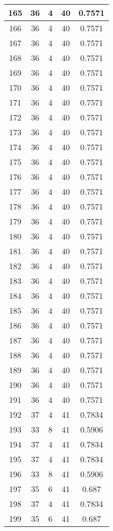 \documentclass[letterpaper, 12pt]{article}
\begin{document}
\begin{longtable}{|c|c|c|c|c|}
\hline
165 & 36 & 4 & 40 & 0.7571 \\
\hline
166 & 36 & 4 & 40 & 0.7571 \\
\hline
167 & 36 & 4 & 40 & 0.7571 \\
\hline
168 & 36 & 4 & 40 & 0.7571 \\
\hline
169 & 36 & 4 & 40 & 0.7571 \\
\hline
170 & 36 & 4 & 40 & 0.7571 \\
\hline
171 & 36 & 4 & 40 & 0.7571 \\
\hline
172 & 36 & 4 & 40 & 0.7571 \\
\hline
173 & 36 & 4 & 40 & 0.7571 \\
\hline
174 & 36 & 4 & 40 & 0.7571 \\
\hline
175 & 36 & 4 & 40 & 0.7571 \\
\hline
176 & 36 & 4 & 40 & 0.7571 \\
\hline
177 & 36 & 4 & 40 & 0.7571 \\
\hline
178 & 36 & 4 & 40 & 0.7571 \\
\hline
179 & 36 & 4 & 40 & 0.7571 \\
\hline
180 & 36 & 4 & 40 & 0.7571 \\
\hline
181 & 36 & 4 & 40 & 0.7571 \\
\hline
182 & 36 & 4 & 40 & 0.7571 \\
\hline
183 & 36 & 4 & 40 & 0.7571 \\
\hline
184 & 36 & 4 & 40 & 0.7571 \\
\hline
185 & 36 & 4 & 40 & 0.7571 \\
\hline
186 & 36 & 4 & 40 & 0.7571 \\
\hline
187 & 36 & 4 & 40 & 0.7571 \\
\hline
188 & 36 & 4 & 40 & 0.7571 \\
\hline
189 & 36 & 4 & 40 & 0.7571 \\
\hline
190 & 36 & 4 & 40 & 0.7571 \\
\hline
191 & 36 & 4 & 40 & 0.7571 \\
\hline
192 & 37 & 4 & 41 & 0.7834 \\
\hline
193 & 33 & 8 & 41 & 0.5906 \\
\hline
194 & 37 & 4 & 41 & 0.7834 \\
\hline
195 & 37 & 4 & 41 & 0.7834 \\
\hline
196 & 33 & 8 & 41 & 0.5906 \\
\hline
197 & 35 & 6 & 41 & 0.687 \\
\hline
198 & 37 & 4 & 41 & 0.7834 \\
\hline
199 & 35 & 6 & 41 & 0.687 \\
\hline
\end{longtable}
\end{document}
